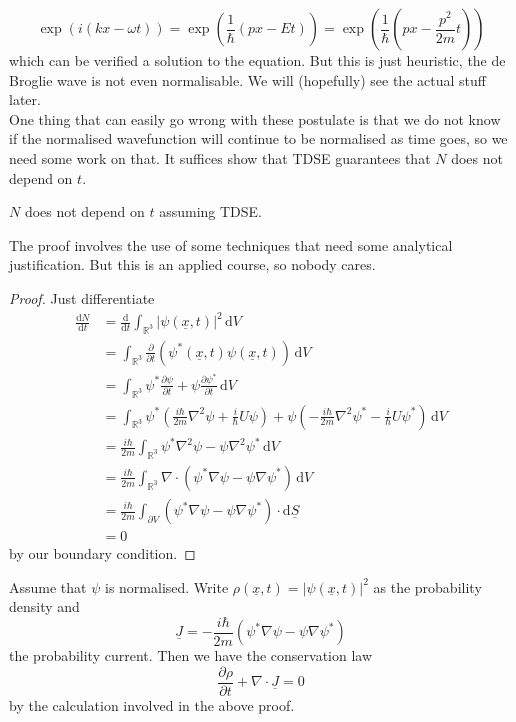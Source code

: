 $$\exp(i(kx-\omega t))=\exp\left( \frac{1}{\hbar}(px-Et) \right)=\exp\left( \frac{1}{\hbar}\left(px-\frac{p^2}{2m}t\right) \right)$$
which can be verified a solution to the equation.
But this is just heuristic, the de Broglie wave is not even normalisable.
We will (hopefully) see the actual stuff later.\\
One thing that can easily go wrong with these postulate is that we do not know if the normalised wavefunction will continue to be normalised as time goes, so we need some work on that.
It suffices show that TDSE guarantees that $N$ does not depend on $t$.
\begin{proposition}
    $N$ does not depend on $t$ assuming TDSE.
\end{proposition}
The proof involves the use of some techniques that need some analytical justification.
But this is an applied course, so nobody cares.
\begin{proof}
    Just differentiate
    \begin{align*}
        \frac{\mathrm dN}{\mathrm dt}&=\frac{\mathrm d}{\mathrm dt}\int_{\mathbb R^3}|\psi(\underline{x},t)|^2\,\mathrm dV\\
        &=\int_{\mathbb R^3}\frac{\partial}{\partial t}\left( \psi^*(\underline{x},t)\psi(\underline{x},t) \right)\,\mathrm dV\\
        &=\int_{\mathbb R^3}\psi^*\frac{\partial\psi}{\partial t}+\psi\frac{\partial \psi^*}{\partial t}\,\mathrm dV\\
        &=\int_{\mathbb R^3}\psi^*\left( \frac{i\hbar}{2m}\nabla^2\psi+\frac{i}{\hbar}U\psi\right)+\psi\left( -\frac{i\hbar}{2m}\nabla^2\psi^*-\frac{i}{\hbar}U\psi^* \right)\,\mathrm dV\\
        &=\frac{i\hbar}{2m}\int_{\mathbb R^3}\psi^*\nabla^2\psi-\psi\nabla^2\psi^*\,\mathrm dV\\
        &=\frac{i\hbar}{2m}\int_{\mathbb R^3}\nabla\cdot( \psi^*\nabla\psi-\psi\nabla\psi^*)\,\mathrm dV\\
        &=\frac{i\hbar}{2m}\int_{\partial V}(\psi^*\nabla\psi-\psi\nabla\psi^*)\cdot\mathrm d\underline{S}\\
        &=0
    \end{align*}
    by our boundary condition.
\end{proof}
\begin{remark}
    Assume that $\psi$ is normalised.
    Write $\rho(\underline{x},t)=|\psi(\underline{x},t)|^2$ as the probability density and
    $$\underline{J}=-\frac{i\hbar}{2m}(\psi^*\nabla\psi-\psi\nabla\psi^*)$$
    the probability current.
    Then we have the conservation law
    $$\frac{\partial\rho}{\partial t}+\nabla\cdot\underline{J}=0$$
    by the calculation involved in the above proof.
\end{remark}
